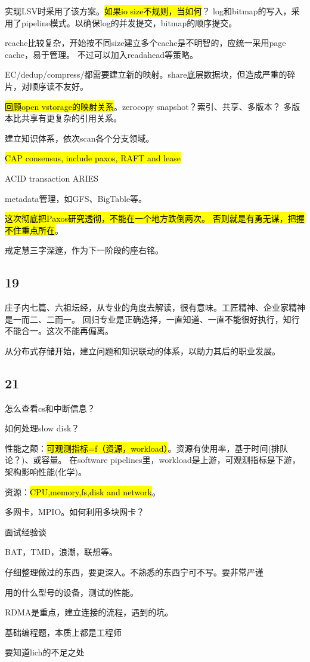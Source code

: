 实现LSV时采用了该方案。\hl{如果io size不规则，当如何}？
log和bitmap的写入，采用了pipeline模式。以确保log的并发提交，bitmap的顺序提交。

rcache比较复杂，开始按不同size建立多个cache是不明智的，应统一采用page cache，易于管理。
不过可以加入readahead等策略。

EC/dedup/compress/都需要建立新的映射。share底层数据块，但造成严重的碎片，对顺序读不友好。

\hl{回顾open vstorage的映射关系}。zerocopy snapshot？索引、共享、多版本？
多版本比共享有更复杂的引用关系。

\hrulefill

建立知识体系，依次scan各个分支领域。
\begin{enumbox}
\item \hl{CAP consensus, include paxos, RAFT and lease}
\item ACID transaction ARIES
\item metadata管理，如GFS、BigTable等。
\end{enumbox}

\hl{这次彻底把Paxos研究透彻，不能在一个地方跌倒两次。
否则就是有勇无谋，把握不住重点所在}。

戒定慧三字深邃，作为下一阶段的座右铭。

\subsection{19}

庄子内七篇、六祖坛经，从专业的角度去解读，很有意味。工匠精神、企业家精神是一而二、二而一。
回归专业是正确选择，一直知道、一直不能很好执行，知行不能合一。这次不能再偏离。

从分布式存储开始，建立问题和知识联动的体系，以助力其后的职业发展。

\subsection{21}

怎么查看cs和中断信息？

如何处理slow disk？

性能之颠：\hl{可观测指标=f（资源，workload）}。资源有使用率，基于时间(排队论？)、或容量。
在software pipelines里，workload是上游，可观测指标是下游，架构影响性能(化学)。

资源：\hl{CPU,memory,fs,disk and network}。

多网卡，MPIO。如何利用多块网卡？

面试经验谈
\begin{enumbox}
\item BAT，TMD，浪潮，联想等。
\item 仔细整理做过的东西，要更深入。不熟悉的东西宁可不写。要非常严谨
\item 用的什么型号的设备，测试的性能。
\item RDMA是重点，建立连接的流程，遇到的坑。
\item 基础编程题，本质上都是工程师
\item 要知道lich的不足之处
\end{enumbox}

